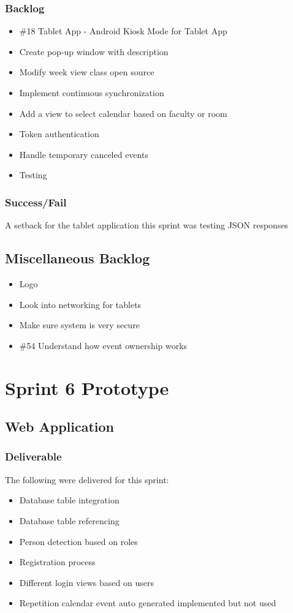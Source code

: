 \subsubsection{Backlog}
\begin{itemize}
\item \#18 Tablet App - Android Kiosk Mode for Tablet App
\item Create pop-up window with description
\item Modify week view class open source
\item Implement continuous synchronization
\item Add a view to select calendar based on faculty or room
\item Token authentication
\item Handle temporary canceled events
\item Testing
\end{itemize}

\subsubsection{Success/Fail}
A setback for the tablet application this sprint was testing JSON responses

\subsection*{Miscellaneous Backlog}
\begin{itemize}
\item Logo
\item Look into networking for tablets
\item Make sure system is very secure
\item \#54 Understand how event ownership works
\end{itemize}

\section{Sprint 6 Prototype}
\subsection{Web Application}
\subsubsection{Deliverable}
The following were delivered for this sprint:
\begin{itemize}
\item Database table integration
\item Database table referencing
\item Person detection based on roles
\item Registration process
\item Different login views based on users
\item Repetition calendar event auto generated implemented but not used
\end{itemize}
